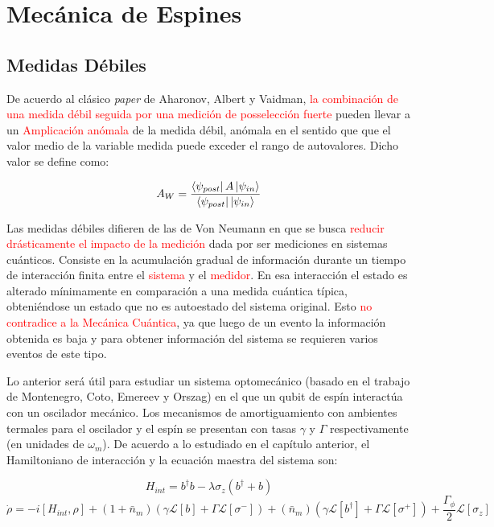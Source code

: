 \documentclass{book}
\begin{document}
\chapter{Mecánica de Espines}
\section{Medidas Débiles}
De acuerdo al clásico \textit{paper} de Aharonov, Albert y Vaidman, \textcolor{red}{la combinación de una medida débil seguida por una medición de posselección fuerte} pueden llevar a un \textcolor{red}{Amplicación anómala} de la medida débil, anómala en el sentido que que el valor medio de la variable medida puede exceder el rango de autovalores. Dicho valor se define como:

\begin{equation}\label{eq10.1}A_W=\frac{\bra{\psi_{post}}A\ket{\psi_{in}}}{\bra{\psi_{post}}\ket{\psi_{in}}}\end{equation}

Las medidas débiles difieren de las de Von Neumann en que se busca \textcolor{red}{reducir drásticamente el impacto de la medición} dada por ser mediciones en sistemas cuánticos. Consiste en la acumulación gradual de información durante un tiempo de interacción finita entre el \textcolor{red}{sistema} y el \textcolor{red}{medidor}. En esa interacción el estado es alterado mínimamente en comparación a una medida cuántica típica, obteniéndose un estado que no es autoestado del sistema original. Esto \textcolor{red}{no contradice a la Mecánica Cuántica}, ya que luego de un evento la información obtenida es baja y para obtener información del sistema se requieren varios eventos de este tipo.

Lo anterior será útil para estudiar un sistema optomecánico (basado en el trabajo de Montenegro, Coto, Emereev y Orszag) en el que un qubit de espín interactúa con un oscilador mecánico. Los mecanismos de amortiguamiento con ambientes termales para el oscilador y el espín se presentan con tasas $\gamma$ y $\Gamma$ respectivamente (en unidades de $\omega_m$). De acuerdo a lo estudiado en el capítulo anterior, el Hamiltoniano de interacción y la ecuación maestra del sistema son:

\begin{equation}\label{eq10.2}H_{int}=b^\dag b-\lambda\sigma_z(b^\dag+b)\end{equation}
\begin{equation}\label{eq10.3}\dot{\rho}=-i[H_{int},\rho]+(1+\bar{n}_m)(\gamma\mathcal{L}[b]+\Gamma\mathcal{L}[\sigma^-])+(\bar{n}_m)(\gamma\mathcal{L}[b^\dag]+\Gamma\mathcal{L}[\sigma^+])+\frac{\Gamma_\phi}{2}\mathcal{L}[\sigma_z]\end{equation}
\end{document}
